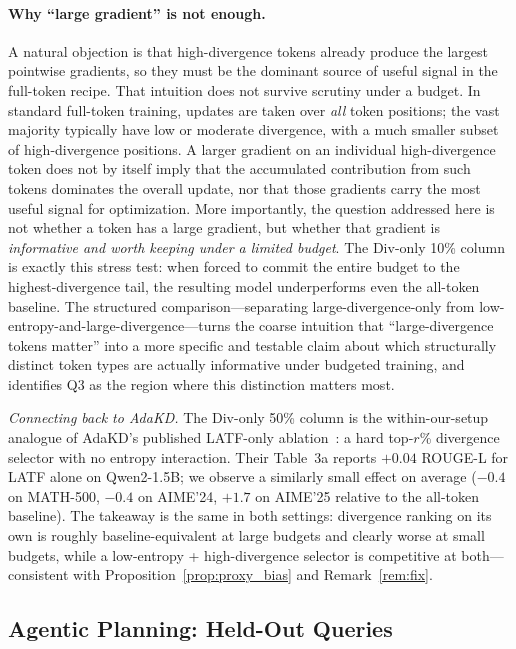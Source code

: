 \documentclass{article}
\begin{document}
\paragraph{Why ``large gradient'' is not enough.}
A natural objection is that high-divergence tokens already produce the largest pointwise gradients, so they must be the dominant source of useful signal in the full-token recipe.
That intuition does not survive scrutiny under a budget.
In standard full-token training, updates are taken over \emph{all} token positions; the vast majority typically have low or moderate divergence, with a much smaller subset of high-divergence positions.
A larger gradient on an individual high-divergence token does not by itself imply that the accumulated contribution from such tokens dominates the overall update, nor that those gradients carry the most useful signal for optimization.
More importantly, the question addressed here is not whether a token has a large gradient, but whether that gradient is \emph{informative and worth keeping under a limited budget}.
The Div-only 10\% column is exactly this stress test: when forced to commit the entire budget to the highest-divergence tail, the resulting model underperforms even the all-token baseline.
The structured comparison---separating large-divergence-only from low-entropy-and-large-divergence---turns the coarse intuition that ``large-divergence tokens matter'' into a more specific and testable claim about which structurally distinct token types are actually informative under budgeted training, and identifies Q3 as the region where this distinction matters most.

\emph{Connecting back to AdaKD.}
The Div-only 50\% column is the within-our-setup analogue of AdaKD's published LATF-only ablation~\citep{xie2026adakd}: a hard top-$r$\% divergence selector with no entropy interaction.
Their Table~3a reports $+0.04$ ROUGE-L for LATF alone on Qwen2-1.5B; we observe a similarly small effect on average ($-0.4$ on MATH-500, $-0.4$ on AIME'24, $+1.7$ on AIME'25 relative to the all-token baseline).
The takeaway is the same in both settings: divergence ranking on its own is roughly baseline-equivalent at large budgets and clearly worse at small budgets, while a low-entropy + high-divergence selector is competitive at both---consistent with Proposition~\ref{prop:proxy_bias} and Remark~\ref{rem:fix}.

\subsection{Agentic Planning: Held-Out Queries}
\label{app:agent_detail}
\end{document}
